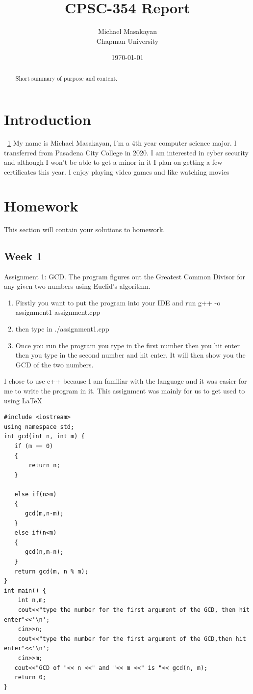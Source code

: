 \documentclass{article}
\title{CPSC-354 Report}
\author{Michael Masakayan  \\ Chapman University}
\date{\today}
\theoremstyle{theorem}
\theoremstyle{definition}
\theoremstyle{remark}
\begin{document}
\maketitle

\begin{abstract}
Short  summary of purpose and content.  
\end{abstract}
\tableofcontents


\section{Introduction}\label{intro}

~\ref{intro} My name is Michael Masakayan, I'm a 4th year computer science major. I transferred from Pasadena City College in 2020. I am interested in cyber security and although I won't be able to get a minor in it I plan on getting a few certificates this year. I enjoy playing video games and like watching movies


\section{Homework}\label{homework}

This section will contain your solutions to homework. 

\subsection{Week 1}
 Assignment 1: GCD. The program figures out the Greatest Common Divisor for any given two numbers using Euclid’s algorithm. 
\begin{enumerate}

\item Firstly you want to put the program into your IDE and run g++ -o assignment1 assignment.cpp
\item then type in ./assignment1.cpp
\item Once you run the program you type in the first number then you hit enter then you type in the second number and hit enter. It will then show you the GCD of the two numbers.
    \end{enumerate}
      I chose to use c++ because I am familiar with the language and it was easier for me to write the program in it. This assignment was mainly for us to get used to using LaTeX
\begin{lstlisting}
#include <iostream>
using namespace std;
int gcd(int n, int m) {
   if (m == 0)
   {
       return n;
   }
  
   else if(n>m)
   {
      gcd(m,n-m);
   }
   else if(n<m)
   {
      gcd(n,m-n);
   }
   return gcd(m, n % m);
}
int main() {
    int n,m;
    cout<<"type the number for the first argument of the GCD, then hit enter"<<'\n';
    cin>>n;
    cout<<"type the number for the first argument of the GCD,then hit enter"<<'\n';
    cin>>m;
   cout<<"GCD of "<< n <<" and "<< m <<" is "<< gcd(n, m);
   return 0;
}
\end{lstlisting}
\end{document}
